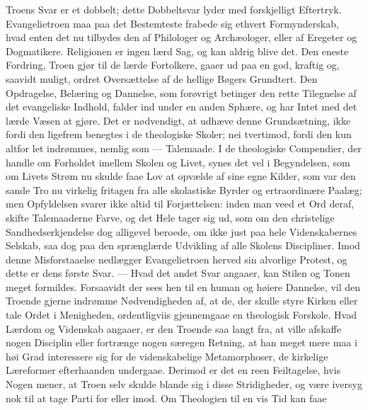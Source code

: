 \documentclass[12pt,a4paper]{book}
\begin{document}
Troens Svar er et dobbelt; dette Dobbeltsvar lyder med forskjelligt Eftertryk.
Evangelietroen maa paa det Bestemteste frabede sig ethvert Formynderskab, hvad enten det
nu tilbydes den af Philologer og Archæologer, eller af Eregeter og Dogmatikere.
Religionen er ingen lærd Sag, og kan aldrig blive det. Den eneste Fordring, Troen gjør
til de lærde Fortolkere, gaaer ud paa en god, kraftig og, saavidt muligt, ordret
Oversættelse af de hellige Bøgers Grundtert. Den Opdragelse, Belæring og Dannelse, som
forøvrigt betinger den rette Tilegnelse af det evangeliske Indhold, falder ind under en
anden Sphære, og har Intet med det lærde Væsen at gjøre. Det er nødvendigt, at udhæve
denne Grundsætning, ikke fordi den ligefrem benegtes i de theologiske Skoler; nei
tvertimod, fordi den kun altfor let indrømmes, nemlig som --- Talemaade. I de theologiske
Compendier, der handle om Forholdet imellem Skolen og Livet, synes det vel i
Begyndelsen, som om Livets Strøm nu skulde faae Lov at opvælde af sine egne Kilder, som
var den sande Tro nu virkelig fritagen fra alle skolastiske Byrder og ertraordinære
Paalæg; men Opfyldelsen svarer ikke altid til Forjættelsen: inden man veed et Ord deraf,
skifte Talemaaderne Farve, og det Hele tager sig ud, som om den christelige
Sandhedserkjendelse dog alligevel beroede, om ikke just paa hele Videnskabernes Selskab,
saa dog paa den sprænglærde Udvikling af alle Skolens Discipliner. Imod denne
Misforstaaelse nedlægger Evangelietroen herved sin alvorlige Protest, og dette er dens
første Svar. --- Hvad det andet Svar angaaer, kan Stilen og Tonen meget formildes.
Forsaavidt der sees hen til en human og høiere Dannelse, vil den Troende gjerne indrømme
Nødvendigheden af, at de, der skulle styre Kirken eller tale Ordet i Menigheden,
ordentligviis gjennemgaae en theologisk Forskole. Hvad Lærdom og Videnskab angaaer, er
den Troende saa langt fra, at ville afskaffe nogen Disciplin eller fortrænge nogen
særegen Retning, at han meget mere maa i høi Grad interessere sig for de videnskabelige
Metamorphoser, de kirkelige Læreformer efterhaanden undergaae. Derimod er det en reen
Feiltagelse, hvis Nogen mener, at Troen selv skulde blande sig i disse Stridigheder, og
være iversyg nok til at tage Parti for eller imod. Om Theologien til en vis Tid kan faae
\end{document}
